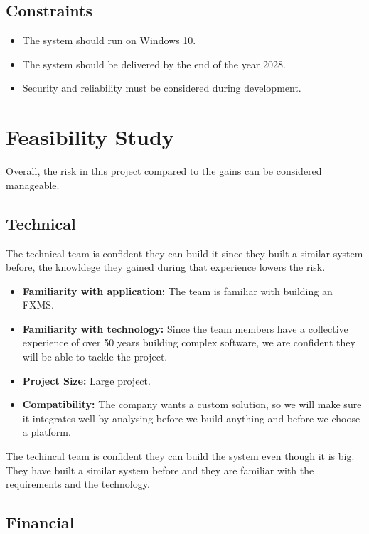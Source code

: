 \documentclass[a4paper]{report}
\begin{document}
\section{Constraints}
\begin{itemize}
    \item The system should run on Windows 10.
    \item The system should be delivered by the end of the year 2028.
    \item Security and reliability must be considered during development.
\end{itemize}

\chapter{Feasibility Study}

Overall, the risk in this project compared to the gains can be considered manageable.

\section{Technical}

The technical team is confident they can build it since they built a similar system before, the knowldege they gained during that experience lowers the risk.

\begin{itemize}
    \item \textbf{Familiarity with application:} The team is familiar with building an FXMS.
    \item \textbf{Familiarity with technology:} Since the team members have a collective experience of over 50 years building complex software, we are confident they will be able to tackle the project.
    \item \textbf{Project Size:} Large project.
    \item \textbf{Compatibility:} The company wants a custom solution, so we will make sure it integrates well by analysing before we build anything and before we choose a platform.
\end{itemize}

The techincal team is confident they can build the system even though it is big. They have built a similar system before and they are familiar with the requirements and the technology.

\newpage

\section{Financial}
\end{document}
